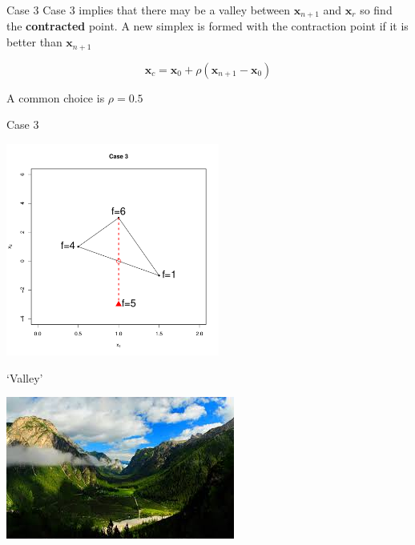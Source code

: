 \documentclass[10pt]{beamer}
\begin{document}
\begin{frame}{Case 3}
  Case 3 implies that there may be a valley between ${\bm x_{n+1}}$ and ${\bm x_{r}}$ so find the {\bf contracted} point.  A new simplex is formed with the contraction point if it is better than ${\bm x_{n+1}}$

  \begin{equation}
    {\bm x_c}={\bm x_0}+\rho({\bm x_{n+1}}-{\bm x_0})
  \end{equation}

  A common choice is $\rho=0.5$
\end{frame}
\begin{frame}{Case 3}
  \begin{center}
    \includegraphics[height=7cm]{RCode/nmcontraction1.pdf}
  \end{center}
\end{frame}
\begin{frame}{`Valley'}
  \begin{center}
    \includegraphics{valley.jpeg}
  \end{center}
\end{frame}
\end{document}
